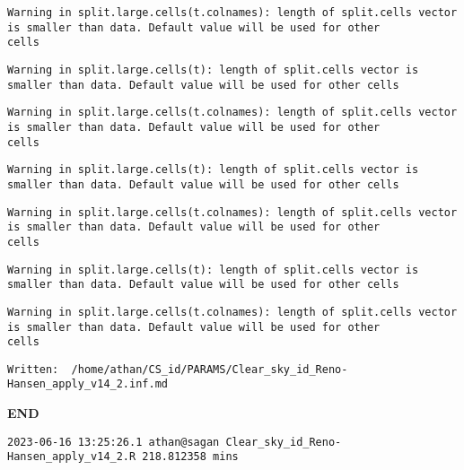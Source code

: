 \documentclass[
  10pt,
  a4paper,oneside]{article}
\begin{document}
\begin{verbatim}
Warning in split.large.cells(t.colnames): length of split.cells vector is smaller than data. Default value will be used for other
cells
\end{verbatim}

\begin{verbatim}
Warning in split.large.cells(t): length of split.cells vector is smaller than data. Default value will be used for other cells
\end{verbatim}

\begin{verbatim}
Warning in split.large.cells(t.colnames): length of split.cells vector is smaller than data. Default value will be used for other
cells
\end{verbatim}

\begin{verbatim}
Warning in split.large.cells(t): length of split.cells vector is smaller than data. Default value will be used for other cells
\end{verbatim}

\begin{verbatim}
Warning in split.large.cells(t.colnames): length of split.cells vector is smaller than data. Default value will be used for other
cells
\end{verbatim}

\begin{verbatim}
Warning in split.large.cells(t): length of split.cells vector is smaller than data. Default value will be used for other cells
\end{verbatim}

\begin{verbatim}
Warning in split.large.cells(t.colnames): length of split.cells vector is smaller than data. Default value will be used for other
cells
\end{verbatim}

\begin{verbatim}
Written:  /home/athan/CS_id/PARAMS/Clear_sky_id_Reno-Hansen_apply_v14_2.inf.md 
\end{verbatim}

\textbf{END}

\begin{verbatim}
2023-06-16 13:25:26.1 athan@sagan Clear_sky_id_Reno-Hansen_apply_v14_2.R 218.812358 mins
\end{verbatim}
\end{document}
